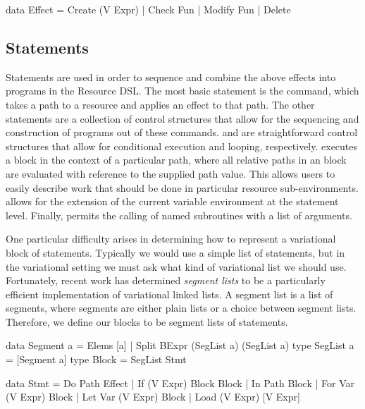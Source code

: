 \documentclass[letterpaper,10pt,onecolumn]{article}
\begin{document}
\begin{program}
data Effect
     = Create (V Expr)
     | Check  Fun
     | Modify Fun
     | Delete
\end{program}

\subsection{Statements}

Statements are used in order to sequence and combine the above effects into programs in the Resource DSL.
The most basic statement is the  command, which takes a path to a resource and applies an effect to that
path. The other statements are a collection of control structures that allow for the sequencing and construction of
programs out of these  commands.  and  are straightforward control structures that allow
for conditional execution and looping, respectively.  executes a block in the context of a particular path, where all
relative paths in an  block are evaluated with reference to the supplied path value. This allows
users to easily describe work that should be done in particular resource sub-environments.  allows for the
extension of the current variable environment at the statement level. Finally,  permits the calling of named
subroutines with a list of arguments. 

One particular difficulty arises in determining how to represent a variational block of statements. Typically we
would use a simple list of statements, but in the variational setting we must ask what kind of variational list
we should use. Fortunately, recent work \cite{lists} has determined \emph{segment lists} to be a particularly
efficient implementation of variational linked lists. A segment list is a list of segments, where segments are either
plain lists or a choice between segment lists. Therefore, we define our blocks to be segment lists of
statements.

\begin{program}
data Segment a = Elems [a] | Split BExpr (SegList a) (SegList a)
type SegList a = [Segment a]
type Block = SegList Stmt

data Stmt
     = Do Path Effect
     | If (V Expr) Block Block
     | In Path Block
     | For Var (V Expr) Block
     | Let Var (V Expr) Block
     | Load (V Expr) [V Expr]
\end{program}




\end{document}
